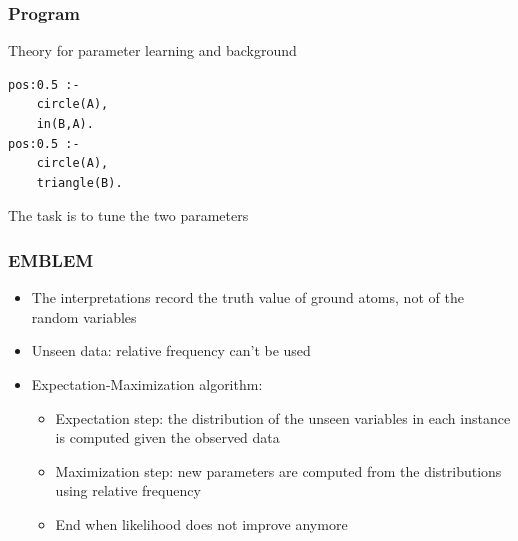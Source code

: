\documentclass[trans,aspectratio=1610]{beamer}
\begin{document}
\begin{frame}[fragile]
  \frametitle{Program}
Theory for parameter learning and background
\begin{small}
\begin{verbatim}
pos:0.5 :-
 	circle(A),
 	in(B,A).
pos:0.5 :-
 	circle(A),
 	triangle(B).
\end{verbatim}
\end{small}
The task is to tune the two parameters
\end{frame}

\begin{frame}
\frametitle{EMBLEM}
\begin{itemize}
 \item The interpretations record the truth value of ground atoms, not of the random variables
\item Unseen data: relative frequency can't be used
\item Expectation-Maximization algorithm:
\begin{itemize}
 \item Expectation step: the distribution of the unseen variables in each instance is computed given the observed data
 \item Maximization step: new parameters are computed from the distributions using relative frequency
 \item End when likelihood does not improve anymore
\end{itemize}
\end{itemize}
\end{frame}


%
\end{document}

